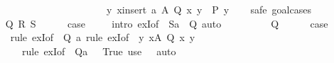 \begin{isabellebody}
\ \ \ \ \ \ \ \ \ \ \ \ \ \ \ \ \ \ \ \ \ \ \ \ \ \ \ {\isacharparenleft}{\kern0pt}{\isasymforall}y{\isachardot}{\kern0pt}\ {\isacharparenleft}{\kern0pt}{\isasymforall}x{\isasymin}insert\ a\ A{\isachardot}{\kern0pt}\ Q\ x\ y{\isacharparenright}{\kern0pt}\ {\isasymlongrightarrow}\ P\ y{\isacharparenright}{\kern0pt}{\isacharparenright}{\kern0pt}{\isachardoublequoteclose}\isanewline
\ \ \isamarkupfalse%
\ {\isacharparenleft}{\kern0pt}safe{\isacharcomma}{\kern0pt}\ goal{\isacharunderscore}{\kern0pt}cases{\isacharparenright}{\kern0pt}\isanewline
\ \ \ \ \isamarkupfalse%
\ {\isacharparenleft}{\kern0pt}{}\ Q\ R\ S{\isacharparenright}{\kern0pt}\isanewline
\ \ \ \ \isamarkupfalse%
\ {\isacharquery}{\kern0pt}case\ \isamarkupfalse%
\ {}\ \isamarkupfalse%
\ {\isacharparenleft}{\kern0pt}intro\ exI{\isacharbrackleft}{\kern0pt}of\ {\isacharunderscore}{\kern0pt}\ {\isachardoublequoteopen}S{\isacharparenleft}{\kern0pt}a\ {\isacharcolon}{\kern0pt}{\isacharequal}{\kern0pt}\ Q{\isacharparenright}{\kern0pt}{\isachardoublequoteclose}{\isacharbrackright}{\kern0pt}{\isacharparenright}{\kern0pt}\ auto\isanewline
\ \ \isamarkupfalse%
\isanewline
\ \ \ \ \isamarkupfalse%
\ {\isacharparenleft}{\kern0pt}{}\ Q{\isacharparenright}{\kern0pt}\isanewline
\ \ \ \ \isamarkupfalse%
\ {\isacharquery}{\kern0pt}case\isanewline
\ \ \ \ \ \ \isamarkupfalse%
\ {\isacharparenleft}{\kern0pt}rule\ exI{\isacharbrackleft}{\kern0pt}of\ {\isacharunderscore}{\kern0pt}\ {\isachardoublequoteopen}Q\ a{\isachardoublequoteclose}{\isacharbrackright}{\kern0pt}{\isacharcomma}{\kern0pt}\ rule\ exI{\isacharbrackleft}{\kern0pt}of\ {\isacharunderscore}{\kern0pt}\ {\isachardoublequoteopen}{\isasymlambda}y{\isachardot}{\kern0pt}\ {\isasymforall}x{\isasymin}A{\isachardot}{\kern0pt}\ Q\ x\ y{\isachardoublequoteclose}{\isacharbrackright}{\kern0pt}{\isacharcomma}{\kern0pt}\isanewline
\ \ \ \ \ \ \ \ \ \ rule\ exI{\isacharbrackleft}{\kern0pt}of\ {\isacharunderscore}{\kern0pt}\ {\isachardoublequoteopen}Q{\isacharparenleft}{\kern0pt}a\ {\isacharcolon}{\kern0pt}{\isacharequal}{\kern0pt}\ {\isacharparenleft}{\kern0pt}{\isasymlambda}{\isacharunderscore}{\kern0pt}{\isachardot}{\kern0pt}\ True{\isacharparenright}{\kern0pt}{\isacharparenright}{\kern0pt}{\isachardoublequoteclose}{\isacharbrackright}{\kern0pt}{\isacharparenright}{\kern0pt}\ {\isacharparenleft}{\kern0pt}use\ {}\ \ auto{\isacharparenright}{\kern0pt}\isanewline

\end{isabellebody}
